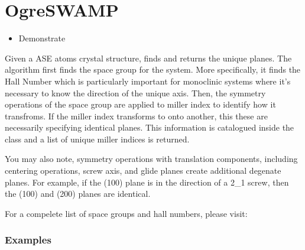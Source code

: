\documentclass[letterpaper,10pt,english,openany,oneside]{sphinxmanual}
\begin{document}
\section{OgreSWAMP}
\label{\detokenize{index:id3}}\begin{itemize}
\item {} 
Demonstrate

\end{itemize}

\begin{fulllineitems}
\label{\detokenize{index:ogre.utils.UniquePlanes}}
Given a ASE atoms crystal structure, finds and returns the unique planes.
The algorithm first finds the space group for the system. More specifically,
it finds the Hall Number which is particularly important for monoclinic
systems where it's necessary to know the direction of the unique axis. Then,
the symmetry operations of the space group are applied to miller index to
identify how it transfroms. If the miller index transforms to onto another,
this these are necessarily specifying identical planes. This information is
catalogued inside the class and a list of unique miller indices is returned.

You may also note, symmetry operations with translation components,
including centering operations, screw axis, and glide planes create
additional degenate planes. For example, if the (100) plane is in the
direction of a 2\_1 screw, then the (100) and (200) planes are identical.
\begin{description}
\item[{For a compelete list of space groups and hall numbers, please visit:}] \leavevmode
{}

\end{description}
\subsubsection*{Examples}


\end{fulllineitems}
\end{document}
